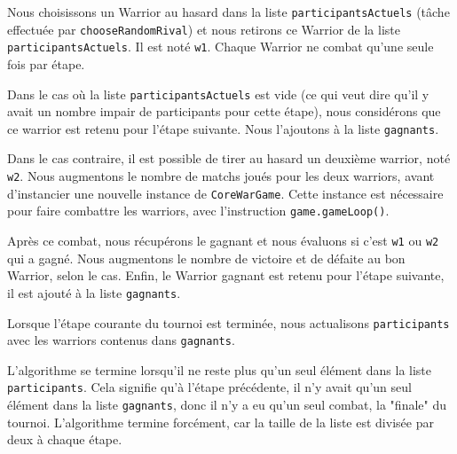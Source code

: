 \documentclass[hidelinks]{report}
\begin{document}
Nous choisissons un Warrior au hasard dans la liste \texttt{participantsActuels} (tâche effectuée par \texttt{chooseRandomRival}) et nous retirons ce Warrior de la liste \texttt{participantsActuels}. Il est noté \texttt{w1}. Chaque Warrior ne combat qu'une seule fois par étape.

Dans le cas où la liste \texttt{participantsActuels} est vide (ce qui veut dire qu'il y avait un nombre impair de participants pour cette étape), nous considérons que ce warrior est retenu pour l'étape suivante. Nous l'ajoutons à la liste \texttt{gagnants}.

Dans le cas contraire, il est possible de tirer au hasard un deuxième warrior, noté \texttt{w2}. Nous augmentons le nombre de matchs joués pour les deux warriors, avant d'instancier une nouvelle instance de \texttt{CoreWarGame}. Cette instance est nécessaire pour faire combattre les warriors, avec l'instruction \texttt{game.gameLoop()}.

Après ce combat, nous récupérons le gagnant et nous évaluons si c'est \texttt{w1} ou \texttt{w2} qui a gagné. Nous augmentons le nombre de victoire et de défaite au bon Warrior, selon le cas. Enfin, le Warrior gagnant est retenu pour l'étape suivante, il est ajouté à la liste \texttt{gagnants}.

Lorsque l'étape courante du tournoi est terminée, nous actualisons \texttt{participants} avec les warriors contenus dans \texttt{gagnants}.

L'algorithme se termine lorsqu'il ne reste plus qu'un seul élément dans la liste \texttt{participants}. Cela signifie qu'à l'étape précédente, il n'y avait qu'un seul élément dans la liste \texttt{gagnants}, donc il n'y a eu qu'un seul combat, la "finale" du tournoi. L'algorithme termine forcément, car la taille de la liste est divisée par deux à chaque étape.
\end{document}
